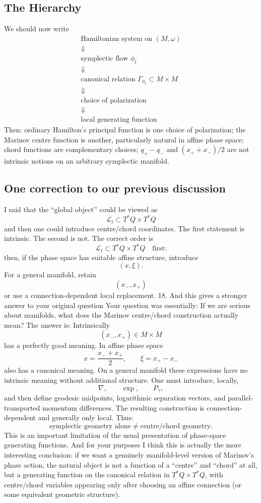 \subsection{The Hierarchy }
We should now write
$$ \boxed{ \begin{array}{c} 
\text{Hamiltonian system on }(M,\omega) \\
\Downarrow \\ 
\text{symplectic flow }\phi_t \\ 
\Downarrow \\ 
\text{canonical relation }\Gamma_{\phi_t}\subset M\times M \\ 
\Downarrow \\ 
\text{choice of polarization} \\ 
\Downarrow \\ 
\text{local generating function} 
\end{array}} $$
Then:
ordinary Hamilton's principal function is one choice of polarization;
the Marinov centre function is another, particularly natural in affine phase space;
chord functions are complementary choices;
\(q_+-q_-\) and \((x_++x_-)/2\) are not intrinsic notions on an arbitrary
symplectic manifold.

\subsection{One correction to our previous discussion} %
I said that the “global object” could be viewed as
$$ \mathcal L_t\subset T^*Q\times T^*Q $$
and then one could introduce centre/chord coordinates.
The first statement is intrinsic.
The second is not.
The correct order is
$$ \boxed{ \mathcal L_t\subset T^*Q\times T^*Q \quad\text{first;} } $$
then, if the phase space has suitable affine structure, introduce
$$ (x,\xi). $$
For a general manifold, retain
$$ (x_-,x_+) $$
or use a connection-dependent local replacement.
18. And this gives a stronger answer to your original question
Your question was essentially:
If we are serious about manifolds, what does the Marinov centre/chord
construction actually mean?
The answer is:
Intrinsically
$$ (x_-,x_+) \in M\times M $$
has a perfectly good meaning.
In affine phase space
$$ x=\frac{x_-+x_+}{2}, \qquad \xi=x_+-x_- $$
also has a canonical meaning.
On a general manifold
these expressions have no intrinsic meaning without additional structure.
One must introduce, locally,
$$ \nabla,\qquad \exp,\qquad P_\gamma, $$
and then define geodesic midpoints, logarithmic separation vectors, and
parallel-transported momentum differences.
The resulting construction is connection-dependent and generally only local.
Thus:
$$ \boxed{ \text{symplectic geometry alone} \neq \text{centre/chord geometry}. } $$
This is an important limitation of the usual presentation of phase-space
generating functions.
And for your purposes I think this is actually the more interesting conclusion:
if we want a genuinely manifold-level version of Marinov's phase action, the
natural object is not a function of a “centre” and “chord” at all, but a
generating function on the canonical relation in \(T^*Q\times T^*Q\), with
centre/chord variables appearing only after choosing an affine connection (or
some equivalent geometric structure).
